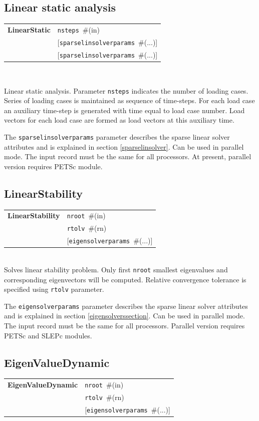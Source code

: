 \documentclass[a4paper]{article}
\makeatletter
\newcommand{\param}[1]{\texttt{#1}} %
\newcommand{\optional}[1]{[#1]} %
\newcommand{\field}[2]{\param{#1}~\#{\tiny(#2)}} %
\newcommand{\optField}[2]{\optional{\field{#1}{#2}}}
\newcommand{\entKeywordInst}[1]{\textbf{#1}} %
\newcommand{\Pmode}[1]{{\sffamily #1}}
\newenvironment{record}[1][]{\begin{tabular}{|ll}}{\end{tabular}\\}
\newcommand{\recentry}[2]{{#1}&{#2}\\}
\newcounter{rcc}
\newenvironment{record}[1][\textwidth]{\setcounter{rcc}{0}\begin{tabular*}{#1}{|ll@{\extracolsep{\fill}}r}}{\end{tabular*}\\}
\newcommand{\recentry}[2]{\ifthenelse{\value{rcc}>0}{&$\backslash$ \\}{\setcounter{rcc}{1}}{#1}&{#2}}
\makeatother
\begin{document}
\subsection{Linear static analysis}
\label{LinearStatic}
\begin{record}
  \recentry{\entKeywordInst{LinearStatic}}{\field{nsteps}{in}}
  \recentry{}{\optField{sparselinsolverparams}{...}}
  \recentry{}{\optField{sparselinsolverparams}{...}}
\end{record}

Linear static analysis.
Parameter \param{nsteps} indicates the number of loading cases.
Series of loading cases is maintained as sequence of time-steps.
For each load case an auxiliary time-step is generated with time
equal to load case number.
Load vectors for each load case are formed as load vectors at
this auxiliary time.

The  \param{sparselinsolverparams} parameter describes the sparse
linear solver attributes and is explained in section \ref{sparselinsolver}.
\Pmode{Can be used in parallel mode. The input record must be the same
for all processors. At present, parallel version requires PETSc module.}


\subsection{LinearStability}
\label{LinearStability}
\begin{record}
  \recentry{\entKeywordInst{LinearStability}}{\field{nroot}{in}}
  \recentry{}{\field{rtolv}{rn}}
  \recentry{}{\optField{eigensolverparams}{...}}
\end{record}
Solves linear stability problem. Only first \param{nroot} smallest
eigenvalues and corresponding eigenvectors will be computed.
Relative convergence tolerance is specified using \param{rtolv} parameter.

The \param{eigensolverparams} parameter describes the sparse
linear solver attributes and is explained in section \ref{eigensolverssection}.
\Pmode{Can be used in parallel mode. The input record must be the same
for all processors. Parallel version requires PETSc and SLEPc modules.}

\subsection{EigenValueDynamic}
\label{EigenValueDynamic}
\begin{record}
  \recentry{\entKeywordInst{EigenValueDynamic}}{\field{nroot}{in}}
  \recentry{}{\field{rtolv}{rn}}
  \recentry{}{\optField{eigensolverparams}{...}}
\end{record}
\end{document}
